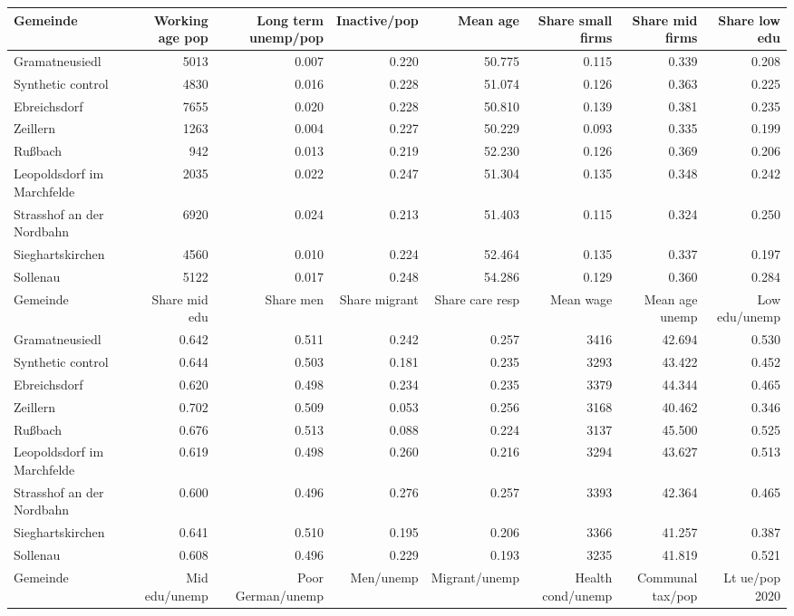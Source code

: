 
\begin{tabular}{lrrrrrrr}
\toprule
Gemeinde & Working age pop & Long term unemp/pop & Inactive/pop & Mean age & Share small firms & Share mid firms & Share low edu\\
\midrule
Gramatneusiedl & 5013 & 0.007 & 0.220 & 50.775 & 0.115 & 0.339 & 0.208\\
Synthetic control & 4830 & 0.016 & 0.228 & 51.074 & 0.126 & 0.363 & 0.225\\
\addlinespace
Ebreichsdorf & 7655 & 0.020 & 0.228 & 50.810 & 0.139 & 0.381 & 0.235\\
Zeillern & 1263 & 0.004 & 0.227 & 50.229 & 0.093 & 0.335 & 0.199\\
Rußbach & 942 & 0.013 & 0.219 & 52.230 & 0.126 & 0.369 & 0.206\\
Leopoldsdorf im Marchfelde & 2035 & 0.022 & 0.247 & 51.304 & 0.135 & 0.348 & 0.242\\
Strasshof an der Nordbahn & 6920 & 0.024 & 0.213 & 51.403 & 0.115 & 0.324 & 0.250\\
Sieghartskirchen & 4560 & 0.010 & 0.224 & 52.464 & 0.135 & 0.337 & 0.197\\
Sollenau & 5122 & 0.017 & 0.248 & 54.286 & 0.129 & 0.360 & 0.284\\
\bottomrule
\toprule
Gemeinde & Share mid edu & Share men & Share migrant & Share care resp & Mean wage & Mean age unemp & Low edu/unemp\\
\midrule
Gramatneusiedl & 0.642 & 0.511 & 0.242 & 0.257 & 3416 & 42.694 & 0.530\\
Synthetic control & 0.644 & 0.503 & 0.181 & 0.235 & 3293 & 43.422 & 0.452\\
\addlinespace
Ebreichsdorf & 0.620 & 0.498 & 0.234 & 0.235 & 3379 & 44.344 & 0.465\\
Zeillern & 0.702 & 0.509 & 0.053 & 0.256 & 3168 & 40.462 & 0.346\\
Rußbach & 0.676 & 0.513 & 0.088 & 0.224 & 3137 & 45.500 & 0.525\\
Leopoldsdorf im Marchfelde & 0.619 & 0.498 & 0.260 & 0.216 & 3294 & 43.627 & 0.513\\
Strasshof an der Nordbahn & 0.600 & 0.496 & 0.276 & 0.257 & 3393 & 42.364 & 0.465\\
Sieghartskirchen & 0.641 & 0.510 & 0.195 & 0.206 & 3366 & 41.257 & 0.387\\
Sollenau & 0.608 & 0.496 & 0.229 & 0.193 & 3235 & 41.819 & 0.521\\
\bottomrule
\toprule
Gemeinde & Mid edu/unemp & Poor German/unemp & Men/unemp & Migrant/unemp & Health cond/unemp & Communal tax/pop & Lt ue/pop 2020\\

\end{tabular}
